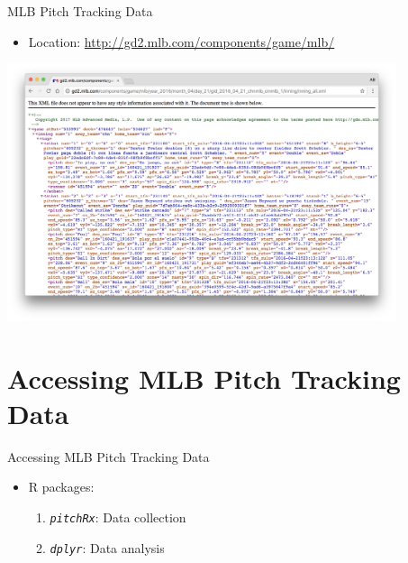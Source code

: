 \documentclass[14pt,ignorenonframetext,aspectratio = 1610]{beamer}
\providecommand{\tightlist}{%
\setlength{\itemsep}{0pt}\setlength{\parskip}{0pt}}
\begin{document}
\begin{frame}{MLB Pitch Tracking Data}

\begin{itemize}
\tightlist
\item
  Location:
  \color{brightpink}\url{http://gd2.mlb.com/components/game/mlb/}
\end{itemize}

\vspace{-1mm}\begin{center}
\includegraphics[width = 4.5in]{../figs/gd_inning_all.png}
\end{center}

\end{frame}

\section{Accessing MLB Pitch Tracking
Data}\label{accessing-mlb-pitch-tracking-data}

\begin{frame}[fragile]{Accessing MLB Pitch Tracking Data}

\begin{itemize}
\tightlist
\item
  R packages:

  \begin{enumerate}
  \def\labelenumi{\arabic{enumi}.}
  \tightlist
  \item
    \emph{\texttt{pitchRx}}: Data collection
  \item
    \emph{\texttt{dplyr}}: Data analysis
  \end{enumerate}
\end{itemize}

\end{frame}
\end{document}

